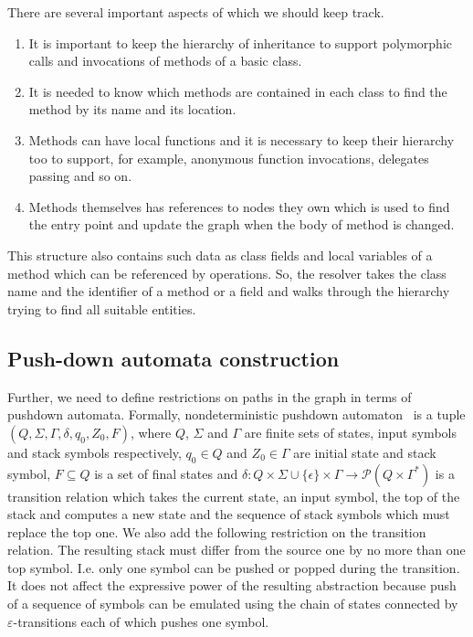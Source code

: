 There are several important aspects of which we should keep track. 
\begin{enumerate}
 \item It is important to keep the hierarchy of inheritance to support polymorphic calls and invocations of methods of a basic class.
 \item It is needed to know which methods are contained in each class to find the method by its name and its location.
 \item Methods can have local functions and it is necessary to keep their hierarchy too to support, for example, anonymous function invocations, delegates passing and so on.
 \item Methods themselves has references to nodes they own which is used to find the entry point and update the graph when the body of method is changed.
\end{enumerate}
This structure also contains such data as class fields and local variables of a method which can be referenced by operations.
So, the resolver takes the class name and the identifier of a method or a field and walks through the hierarchy trying to find all suitable entities.

\subsection{Push-down automata construction}

Further, we need to define restrictions on paths in the graph in terms of pushdown automata.
Formally, nondeterministic pushdown automaton~\cite{AutomataTheory} is a tuple $(Q, \Sigma, \Gamma, \delta, q_0, Z_0, F)$, where $Q$, $\Sigma$ and $\Gamma$ are finite sets of states, input symbols and stack symbols respectively, $q_0 \in Q$ and $Z_0 \in \Gamma$ are initial state and stack symbol, $F \subseteq Q$ is a set of final states and $\delta: Q \times \Sigma \cup \{\epsilon\} \times \Gamma \rightarrow \mathcal P (Q \times \Gamma^*)$ is a transition relation which takes the current state, an input symbol, the top of the stack and computes a new state and the sequence of stack symbols which must replace the top one.
We also add the following restriction on the transition relation.
The resulting stack must differ from the source one by no more than one top symbol. I.e. only one symbol can be pushed or popped during the transition.
It does not affect the expressive power of the resulting abstraction because push of a sequence of symbols can be emulated using the chain of states connected by $\varepsilon$-transitions each of which pushes one symbol.

